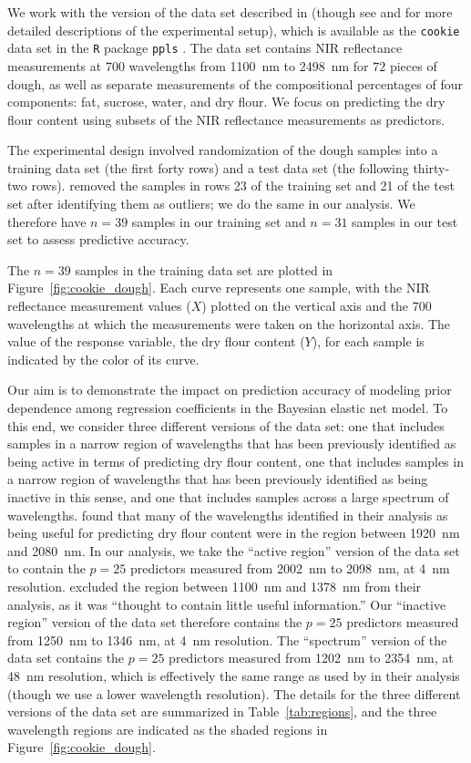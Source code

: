 \documentclass[12pt]{article}
\begin{document}
We work with the version of the data set described in 
\citet{grif:11} (though see \citet{osbo:84} and \citet{brow:01} for more detailed
descriptions of the experimental setup), which is available as the \texttt{cookie}
data set in the \texttt{R} package \texttt{ppls} \citet{krae:08, krae:25}. The data
set contains NIR reflectance measurements at $700$ wavelengths from 1100~nm to 
2498~nm for $72$ pieces of dough, as well as separate measurements of the 
compositional percentages of four components: fat, sucrose, water, and dry flour.
We focus on predicting the dry flour content using subsets of the NIR reflectance 
measurements as predictors. 

The experimental design \citep{osbo:84} involved randomization of the dough samples 
into a training data set (the first forty rows) and a test data set (the following
thirty-two rows). \citet{osbo:84} removed the samples in rows 23 of the training set
and 21 of the test set after identifying them as outliers; we do the same in our analysis. 
We therefore have $n=39$ samples in our training set and $n=31$ samples in our test
set to assess predictive accuracy. 

The $n=39$ samples in the training data set are plotted in Figure~\ref{fig:cookie_dough}.
Each curve represents one sample, with the NIR reflectance measurement values ($X$) plotted 
on the vertical axis and the $700$ wavelengths at which the measurements were taken on the 
horizontal axis. The value of the response variable, the dry flour content ($Y$), for each 
sample is indicated by the color of its curve. 

Our aim is to demonstrate the impact on prediction accuracy of modeling prior dependence 
among regression coefficients in the Bayesian elastic net model. To this end, we consider
three different versions of the data set: one that includes samples in a narrow region of 
wavelengths that has been previously identified as being active in terms of predicting dry 
flour content, one that includes samples in a narrow region of wavelengths that has been 
previously identified as being inactive in this sense, and one that includes samples across
a large spectrum of wavelengths. \citet{grif:11} found that many of the wavelengths
identified in their analysis as being useful for predicting dry flour content were in 
the region between 1920~nm and 2080~nm. In our analysis, we take the ``active region'' 
version of the data set to contain the $p=25$ predictors measured from 2002~nm to
2098~nm, at 4~nm resolution. \citet{brow:01} excluded the region between 1100~nm and
1378~nm from their analysis, as it was ``thought to contain little useful information.''
Our ``inactive region'' version of the data set therefore contains the $p=25$ predictors
measured from 1250~nm to 1346~nm, at 4~nm resolution. The ``spectrum'' version of the data set
contains the $p=25$ predictors measured from 1202~nm to 2354~nm, at 48~nm resolution, which
is effectively the same range as used by \citet{grif:11} in their analysis (though we use a
lower wavelength resolution).  The details for the three different versions of the
data set are summarized in Table~\ref{tab:regions}, and the three wavelength regions
are indicated as the shaded regions in Figure~\ref{fig:cookie_dough}.
\end{document}
